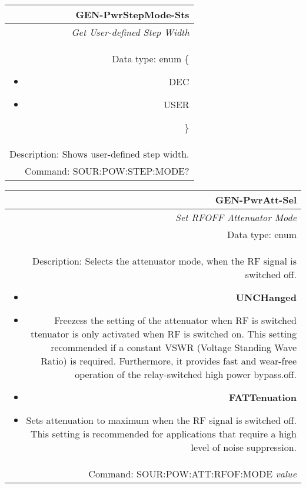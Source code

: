 \documentclass[openany]{article}
\begin{document}
		\begin{tabular}{N}
			\hline
			\bfseries GEN-PwrStepMode-Sts \\ \hline
			\emph{Get User-defined Step Width} \\
			Data type: enum \{\begin{itemize}[noitemsep]
				\small
				\item[] DEC
				\item[] USER
			\end{itemize}\} \\
			Description: Shows user-defined step width. \\
			Command: SOUR:POW:STEP:MODE? \\

		\end{tabular}
%
		\begin{tabular}{N}
			\hline
			\bfseries GEN-PwrAtt-Sel  \\ \hline
			\emph{Set RFOFF Attenuator Mode} \\
			Data type: enum \\
			Description: Selects the attenuator mode, when the RF signal is switched off. \begin{itemize}[noitemsep]
				\small
				\item[] \textbf{UNCHanged}
				\item[] Freezess the setting of the attenuator when RF is switched ttenuator is only activated when RF is switched on. This setting recommended if a constant VSWR (Voltage Standing Wave Ratio) is required. Furthermore, it provides fast and wear-free operation of the relay-switched high power bypass.off.
				\item[] \textbf{FATTenuation}
				\item[] Sets attenuation to maximum when the RF signal is switched off. This setting is recommended for applications that require a high level of noise suppression.
			\end{itemize} \\
			Command: SOUR:POW:ATT:RFOF:MODE \emph{value} \\

		\end{tabular}
\end{document}
